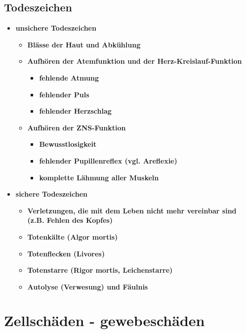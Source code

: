 \subsection{Todeszeichen}
	\begin{itemize}
		\item \textbf{unsichere Todeszeichen}
			\begin{itemize}
				\item \textbf{Blässe der Haut und Abkühlung}
				\item \textbf{Aufhören der Atemfunktion und der Herz-Kreislauf-Funktion}
					\begin{itemize}
						\item \textbf{fehlende Atmung}
						\item \textbf{fehlender Puls}
						\item \textbf{fehlender Herzschlag}
					\end{itemize}
				\item \textbf{Aufhören der ZNS-Funktion}
					\begin{itemize}
						\item \textbf{Bewusstlosigkeit}
						\item \textbf{fehlender Pupillenreflex (vgl. Areflexie)}
						\item \textbf{komplette Lähmung aller Muskeln}
					\end{itemize}
			\end{itemize}
		\item \textbf{sichere Todeszeichen}
			\begin{itemize}
				\item \textbf{Verletzungen, die mit dem Leben nicht mehr vereinbar sind (z.B. Fehlen des Kopfes)}
				\item \textbf{Totenkälte (Algor mortis)}
				\item \textbf{Totenflecken (Livores)}
				\item \textbf{Totenstarre (Rigor mortis, Leichenstarre)}
				\item \textbf{Autolyse (Verwesung) und Fäulnis}
			\end{itemize}
	\end{itemize}

\section{Zellschäden - gewebeschäden}


